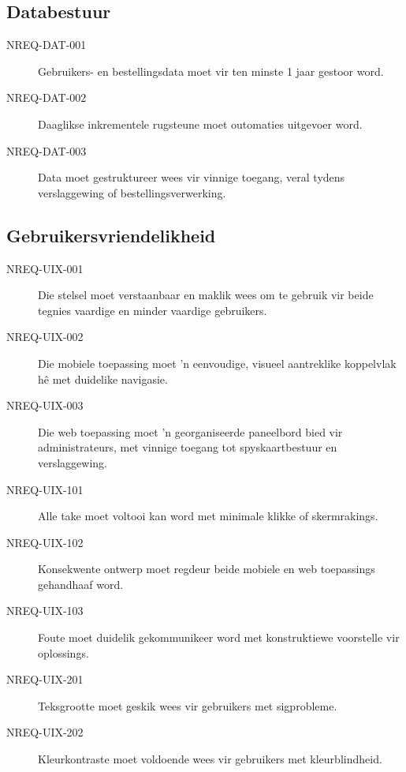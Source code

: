\subsection{Databestuur}
\begin{description}
  \item[NREQ-DAT-001] Gebruikers- en bestellingsdata moet vir ten minste 1 jaar gestoor word.
  \item[NREQ-DAT-002] Daaglikse inkrementele rugsteune moet outomaties uitgevoer word.
  \item[NREQ-DAT-003] Data moet gestruktureer wees vir vinnige toegang, veral tydens verslaggewing of bestellingsverwerking.
\end{description}

\subsection{Gebruikersvriendelikheid}
\begin{description}  \item[NREQ-UIX-001] Die stelsel moet verstaanbaar en maklik wees om te gebruik vir beide tegnies vaardige en minder vaardige gebruikers.
  \item[NREQ-UIX-002] Die mobiele toepassing moet 'n eenvoudige, visueel aantreklike koppelvlak hê met duidelike navigasie.
  \item[NREQ-UIX-003] Die web toepassing moet 'n georganiseerde paneelbord bied
  vir administrateurs, met vinnige toegang tot spyskaartbestuur en
  verslaggewing.  
  \item[NREQ-UIX-101] Alle take moet voltooi kan word met minimale klikke of skermrakings.
  \item[NREQ-UIX-102] Konsekwente ontwerp moet regdeur beide mobiele en web toepassings gehandhaaf word.
  \item[NREQ-UIX-103] Foute moet duidelik gekommunikeer word met konstruktiewe voorstelle vir oplossings.
  \item[NREQ-UIX-201] Teksgrootte moet geskik wees vir gebruikers met sigprobleme.
  \item[NREQ-UIX-202] Kleurkontraste moet voldoende wees vir gebruikers met kleurblindheid.
\end{description}

